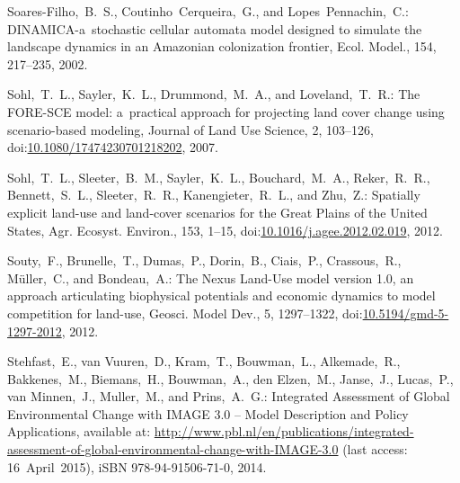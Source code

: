 \documentclass[gmdd, online, hvmath]{copernicus}
\begin{document}
\begin{thebibliography}{97}
    {Soares-Filho},~B.~S., Coutinho~Cerqueira,~G., and
    Lopes~Pennachin,~C.: DINAMICA-a~stochastic cellular automata model
    designed to simulate the landscape dynamics in an Amazonian
    colonization frontier, Ecol. Model., 154, 217--235, 2002.


   Sohl,~T.~L., Sayler,~K.~L.,
    Drummond,~M.~A., and Loveland,~T.~R.: The {FORE-SCE} model:
    a~practical approach for projecting land cover change using
    scenario-based modeling, Journal of Land Use
    Science, 2,
    103--126,
doi:\href{http://dx.doi.org/10.1080/17474230701218202}{10.1080/17474230701218202}, 2007.


   Sohl,~T.~L.,
    Sleeter,~B.~M., Sayler,~K.~L., Bouchard,~M.~A., Reker,~R.~R.,
    Bennett,~S.~L., Sleeter,~R.~R., Kanengieter,~R.~L., and Zhu,~Z.:
    Spatially explicit land-use and land-cover scenarios for the Great
    Plains of the United States, Agr. Ecosyst. Environ., 153, 1--15,
    doi:\href{http://dx.doi.org/10.1016/j.agee.2012.02.019}{10.1016/j.agee.2012.02.019}, 2012.


  Souty,~F., Brunelle,~T., Dumas,~P., Dorin,~B., Ciais,~P.,
  Crassous,~R., M\"{u}ller,~C., and Bondeau,~A.: The Nexus Land-Use
  model version 1.0, an approach articulating biophysical potentials
  and economic dynamics to model competition for land-use,
  Geosci. Model Dev., 5, 1297--1322,
doi:\href{http://dx.doi.org/10.5194/gmd-5-1297-2012}{10.5194/gmd-5-1297-2012},
  2012. %



 Stehfast,~E., van
  Vuuren,~D., Kram,~T., Bouwman,~L., Alkemade,~R., Bakkenes,~M.,
  Biemans,~H., Bouwman,~A., den Elzen,~M., Janse,~J., Lucas,~P., van
  Minnen,~J., Muller,~M., and Prins,~A.~G.: Integrated Assessment of
  Global Environmental Change with IMAGE 3.0 -- Model Description and
  Policy Applications, available at:
  \url{http://www.pbl.nl/en/publications/integrated-assessment-of-global-environmental-change-with-IMAGE-3.0}
  (last access: 16~April~2015), iSBN
  978-94-91506-71-0, 2014.



\end{thebibliography}
\end{document}
